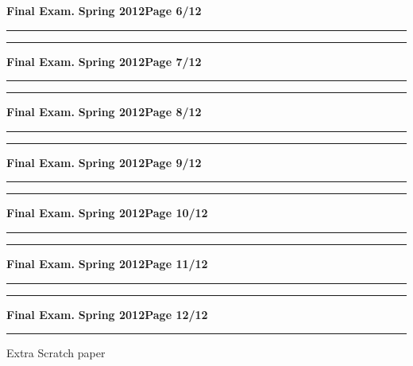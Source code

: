 \documentclass[12pt]{article}
\begin{document}
\hfill{\large\bf Final Exam.}\hfill{\large\bf
  Spring 2012}\hfill{\large\bf Page 6/12}\hrule

\vspace{13cm}
\hrule
\newpage

\hfill{\large\bf Final Exam.}\hfill{\large\bf
  Spring 2012}\hfill{\large\bf Page 7/12}\hrule

\vspace{13cm}
\hrule
\newpage
\hfill{\large\bf Final Exam.}\hfill{\large\bf
  Spring 2012}\hfill{\large\bf Page 8/12}\hrule

\vspace{13cm}
\hrule
\newpage
\hfill{\large\bf Final Exam.}\hfill{\large\bf
  Spring 2012}\hfill{\large\bf Page 9/12}\hrule

\vspace{13cm}
\hrule
\newpage
\hfill{\large\bf Final Exam.}\hfill{\large\bf
  Spring 2012}\hfill{\large\bf Page 10/12}\hrule

\vspace{13cm}
\hrule
\newpage
\hfill{\large\bf Final Exam.}\hfill{\large\bf
  Spring 2012}\hfill{\large\bf Page 11/12}\hrule

\vspace{13cm}
\hrule
\newpage
\hfill{\large\bf Final Exam.}\hfill{\large\bf
  Spring 2012}\hfill{\large\bf Page 12/12}\hrule

\vspace{0.5cm}
\large{Extra Scratch paper}\label{scratch}
\end{document}
